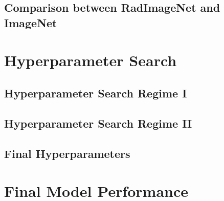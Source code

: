 

\subsection{Comparison between RadImageNet and ImageNet}

\section{Hyperparameter Search}

\subsection{Hyperparameter Search Regime I}









\subsection{Hyperparameter Search Regime II}



\subsection{Final Hyperparameters}

\section{Final Model Performance}
